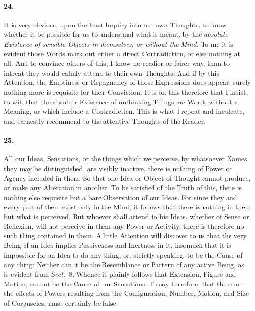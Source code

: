 \documentclass[]{article}
\newenvironment{sectionbody}{}{}
\begin{document}
\begin{sectionbody}
\paragraph{24.} It is very obvious, upon the least Inquiry into our own Thoughts,
to know whether it be possible for us to understand what is
meant, by the \emph{absolute Existence of sensible Objects in
themselves, or without the Mind}.  To me it is evident those
Words mark out either a direct Contradiction, or else nothing at
all.  And to convince others of this, I know no readier or fairer
way, than to intreat they would calmly attend to their own
Thoughts: And if by this Attention, the Emptiness or Repugnancy
of those Expressions does appear, surely nothing more is
requisite for their Conviction.  It is on this therefore that I
insist, to wit, that the absolute Existence of unthinking Things
are Words without a Meaning, or which include a Contradiction.
This is what I repeat and inculcate, and earnestly recommend to
the attentive Thoughts of the Reader.



\paragraph{25.} All our Ideas, Sensations, or the things which we perceive, by
whatsoever Names they may be distinguished, are visibly inactive,
there is nothing of Power or Agency included in them.  So that
one Idea or Object of Thought cannot produce, or make any
Alteration in another.  To be satisfied of the Truth of this,
there is nothing else requisite but a bare Observation of our
Ideas.  For since they and every part of them exist only in the
Mind, it follows that there is nothing in them but what is
perceived.  But whoever shall attend to his Ideas, whether of
Sense or Reflexion, will not perceive in them any Power or
Activity; there is therefore no such thing contained in them.
A little Attention will discover to us that the very Being of an
Idea implies Passiveness and Inertness in it, insomuch that it is
impossible for an Idea to do any thing, or, strictly speaking, to
be the Cause of any thing: Neither can it be the Resemblance or
Pattern of any active Being, as is evident from \emph{Sect.}~8.
Whence it plainly follows that Extension, Figure and Motion,
cannot be the Cause of our Sensations.  To say therefore, that
these are the effects of Powers resulting from the Configuration,
Number, Motion, and Size of Corpuscles, must certainly be false.




\end{sectionbody}
\end{document}
